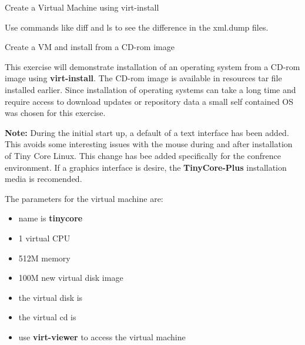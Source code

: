 \begin{Lab}
\begin{exe}  {Create a Virtual Machine using virt-install}
\begin{sol}
\begin{enumerate}
			Use commands like diff and ls to see the difference in the xml.dump files. 

		\end{enumerate}

	\end{sol}

\end{exe} 

\begin{exe} {Create a VM and install from a CD-rom image} 

	This exercise will demonstrate installation of an 
	operating system from a CD-rom image
	using \textbf{virt-install}. 
	The CD-rom image is available in resources tar
	file installed earlier. Since 
	installation of operating systems can take a
	long time and require access to 
	download updates or repository data a 
	small self contained OS was chosen for 
	this exercise. 

	\textbf{Note:} During the initial start up, 
	a default of a text interface has been added.
	This avoids 
	some interesting issues with the mouse 
	during and after installation of Tiny Core Linux.
	This change has bee added specifically for the 
	confrence environment. If a graphics interface is 
	desire, the \textbf{TinyCore-Plus} installation
	media is recomended.  

 The parameters for the virtual machine are:
        \begin{itemize}
                \item name is \textbf{tinycore}
                \item 1 virtual CPU
                \item 512M memory
		\item 100M new virtual disk image
                \item the virtual disk is 
                \item the virtual cd is 
                \item use \textbf{virt-viewer} 
			to access the virtual machine
	\end{itemize}


\end{exe}
\end{Lab}
